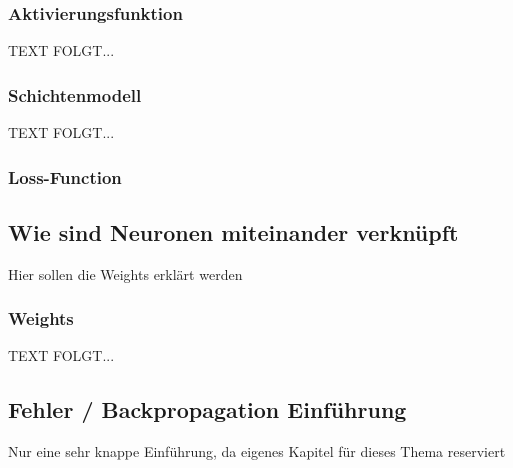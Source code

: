 \newpage
\subsubsection{Aktivierungsfunktion}\label{subsec:neuronen:aktivierungsfunktion}
  
  TEXT FOLGT... 


\newpage
\subsubsection{Schichtenmodell}\label{subsec:neuronen:schichtenmodell}
  TEXT FOLGT... 

\subsubsection{Loss-Function}

\newpage 
\subsection{Wie sind Neuronen miteinander verknüpft}\label{subsec:neuronen:verknuepfung_neuronen}  
%
Hier sollen die Weights erklärt werden

\subsubsection{Weights}\label{Weights}
  TEXT FOLGT... 

\subsection{Fehler / Backpropagation Einführung}\label{subsec:neuronen:fehler_backpropagation}
Nur eine sehr knappe Einführung, da eigenes Kapitel für dieses Thema reserviert

